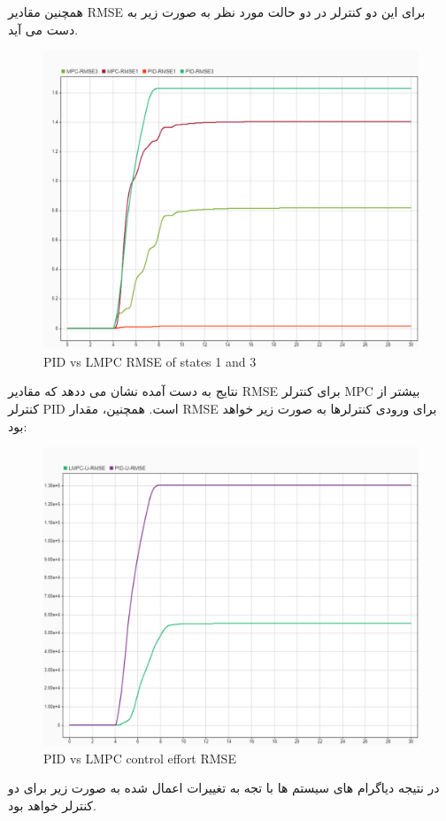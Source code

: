 همچنین مقادیر RMSE برای این دو کنترلر در دو حالت مورد نظر به صورت زیر به دست می آید.

\begin{figure}[H]
	\centering
	\includegraphics[width=1\linewidth]{../img/15}
	\caption{PID vs LMPC RMSE of states 1 and 3}
	\label{fig:15}
\end{figure}
نتایج به دست آمده نشان می ددهد که مقادیر RMSE برای کنترلر MPC بیشتر از کنترلر PID است. 
همچنین، مقدار RMSE برای ورودی کنترلرها به صورت زیر خواهد بود:

\begin{figure}[H]
	\centering
	\includegraphics[width=1\linewidth]{../img/16}
	\caption{PID vs LMPC control effort RMSE}
	\label{fig:16}
\end{figure}
در نتیجه دیاگرام های سیستم ها با تجه به تغییرات اعمال شده به صورت زیر برای دو کنترلر خواهد بود.

